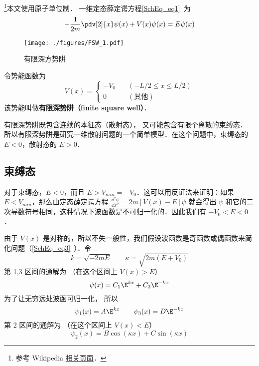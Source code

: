 
\begin{issues}
\issueTODO
\end{issues}





\footnote{参考 Wikipedia \href{https://en.wikipedia.org/wiki/Finite_potential_well}{相关页面}．}本文使用原子单位制． 一维定态薛定谔方程\autoref{SchEq_eq1}~为
\begin{equation}
-\frac{1}{2m}\pdv[2]{x}\psi(x) + V(x) \psi(x) = E \psi(x)
\end{equation}

\begin{figure}[ht]
\centering
\texttt{[image: ./figures/FSW\_1.pdf]}
\caption{有限深方势阱} \label{FSW_fig1}
\end{figure}
令势能函数为
\begin{equation}
V(x) = \begin{cases}
-V_0 \quad &(-L/2 \leqslant x \leqslant L/2)\\
0 \quad &(\text{其他})
\end{cases}
\end{equation}
该势能叫做\textbf{有限深势阱（finite square well）}．

有限深势阱既包含连续的本征态（散射态）， 又可能包含有限个离散的束缚态． %
所以有限深势阱是研究一维散射问题的一个简单模型．在这个问题中，束缚态的 $E<0$，散射态的 $E>0$．

\subsection{束缚态}
对于束缚态，$E<0$，而且 $E> V_{min}=-V_0$．这可以用反证法来证明：如果 $E<V_{min}$，那么由定态薛定谔方程 $\frac{\dd {^2}\psi}{\dd x^2}=2m[V(x)-E]\psi$ 就会得出 $\psi$ 和它的二次导数符号相同，这种情况下波函数是不可归一化的．因此我们有 $-V_0<E<0$．

由于 $V(x)$ 是对称的，所以不失一般性，我们假设波函数是奇函数或偶函数来简化问题（\autoref{SchEq_eq3}~）．令
\begin{equation}\label{FSW_eq4}
k = \sqrt{-2mE} \qquad \kappa = \sqrt{2m(E + V_0)}
\end{equation}
第 1,3 区间的通解为 （在这个区间上 $V(x) > E$）
\begin{equation}
\psi(x) = C_1 \E^{kx} + C_2 \E^{-kx}
\end{equation}
为了让无穷远处波函可归一化， 所以
\begin{equation}
\psi_1(x) = A \E^{kx} \qquad \psi_3(x) = D\E^{-kx}
\end{equation}
第 2 区间的通解为 （在这个区间上 $V(x) < E$）
\begin{equation}
\psi_2(x) = B \cos(\kappa x) + C\sin(\kappa x)
\end{equation}

